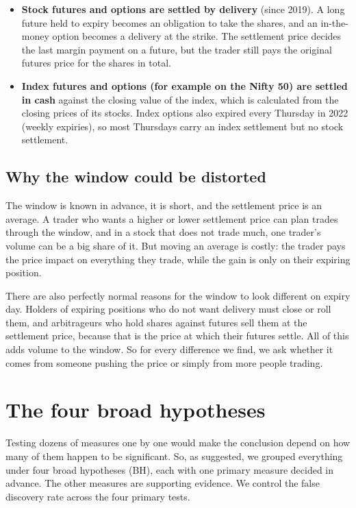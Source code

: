 \documentclass[11pt,a4paper]{article}
\begin{document}
\begin{itemize}
  \item \textbf{Stock futures and options are settled by delivery} (since 2019). A long future held
  to expiry becomes an obligation to take the shares, and an in-the-money option becomes a
  delivery at the strike. The settlement price decides the last margin payment on a future, but
  the trader still pays the original futures price for the shares in total.
  \item \textbf{Index futures and options (for example on the Nifty 50) are settled in cash}
  against the closing value of the index, which is calculated from the closing prices of its
  stocks. Index options also expired every Thursday in 2022 (weekly expiries), so most Thursdays
  carry an index settlement but no stock settlement.
\end{itemize}

\subsection{Why the window could be distorted}

The window is known in advance, it is short, and the settlement price is an average. A trader
who wants a higher or lower settlement price can plan trades through the window, and in a stock
that does not trade much, one trader's volume can be a big share of it. But moving an average is
costly: the trader pays the price impact on everything they trade, while the gain is only on
their expiring position.

There are also perfectly normal reasons for the window to look different on expiry day. Holders
of expiring positions who do not want delivery must close or roll them, and arbitrageurs who
hold shares against futures sell them at the settlement price, because that is the price at
which their futures settle. All of this adds volume to the window. So for every difference we
find, we ask whether it comes from someone pushing the price or simply from more people
trading.

\section{The four broad hypotheses}\label{sec:hyp}

Testing dozens of measures one by one would make the conclusion depend on how many of them
happen to be significant. So, as suggested, we grouped everything under four broad hypotheses
(BH), each with one primary measure decided in advance. The other measures are supporting
evidence. We control the false discovery rate across the four primary tests.
\end{document}
